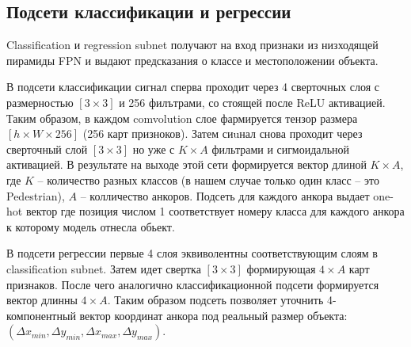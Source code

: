\subsection{Подсети классификации и регрессии}

Classification и regression subnet получают на вход признаки из низходящей пирамиды FPN и выдают предсказания о классе и местоположении объекта. 

В подсети классификации сигнал сперва проходит через 4 сверточных слоя с размерностью $[3 \times 3]$ и 256 филътрами, со стоящей после ReLU активацией. Таким образом, в каждом comvolution слое фармируется тензор размера $[h \times W \times 256]$ (256 карт призноков). Затем сиuнал снова проходит через сверточный слой $[3 \times 3]$ но уже с $K \times A$ фильтрами и сигмоидальной активацией. В результате на выходе этой сети формируется вектор длиной $K \times A$, где $K$ -- количество разных классов (в нашем случае только один класс -- это Pedestrian), $A$ -- колличество анкоров. Подсеть для каждого анкора выдает one-hot вектор где позиция числом 1 соответствует номеру класса для каждого анкора к которому модель отнесла обьект.

В подсети регрессии первые 4 слоя эквиволентны соответствующим слоям в classification subnet. Затем идет свертка  $[3 \times 3]$ формирующая $4 \times A$ карт признаков. После чего аналогично классификационной подсети формируется вектор длинны $4 \times A$. Таким образом подсеть позволяет уточнить 4-компонентный вектор координат анкора под реальный размер объекта: $(\Delta x_{min}, \Delta y_{min}, \Delta x_{max}, \Delta y_{max})$.